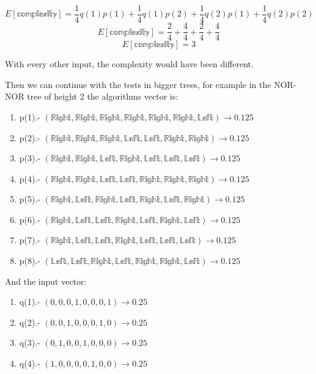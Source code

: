 \documentclass[a4paper,10pt]{article}
\begin{document}
$$E[\mathbb{complexity}] = \frac{1}{4}q(1)p(1) + \frac{1}{4}q(1)p(2) + \frac{1}{4}q(2)p(1) + \frac{1}{4}q(2)p(2)$$
$$E[\mathbb{complexity}] = \frac{2}{4} + \frac{4}{4} + \frac{2}{4} + \frac{4}{4}$$
$$E[\mathbb{complexity}] = 3$$

With every other input, the complexity would have been different.

Then we can continue with the tests in bigger trees, for example in the NOR-NOR tree
of height 2 the algorithms vector is:

\begin{enumerate}
  \item p(1).- $(\mathbb{Right},\mathbb{Right},\mathbb{Right},\mathbb{Right},\mathbb{Right},\mathbb{Right},\mathbb{Left}) \to 0.125$
  \item p(2).- $(\mathbb{Right},\mathbb{Right},\mathbb{Right},\mathbb{Left},\mathbb{Left},\mathbb{Right},\mathbb{Right}) \to 0.125$
  \item p(3).- $(\mathbb{Right},\mathbb{Right},\mathbb{Left},\mathbb{Right},\mathbb{Left},\mathbb{Left},\mathbb{Left}) \to 0.125$
  \item p(4).- $(\mathbb{Right},\mathbb{Right},\mathbb{Left},\mathbb{Left},\mathbb{Right},\mathbb{Right},\mathbb{Right}) \to 0.125$
  \item p(5).- $(\mathbb{Right},\mathbb{Left},\mathbb{Right},\mathbb{Left},\mathbb{Right},\mathbb{Left},\mathbb{Right}) \to 0.125$
  \item p(6).- $(\mathbb{Right},\mathbb{Left},\mathbb{Left},\mathbb{Right},\mathbb{Left},\mathbb{Right},\mathbb{Left}) \to 0.125$
  \item p(7).- $(\mathbb{Right},\mathbb{Left},\mathbb{Left},\mathbb{Right},\mathbb{Left},\mathbb{Left},\mathbb{Left}) \to 0.125$
  \item p(8).- $(\mathbb{Left},\mathbb{Left},\mathbb{Right},\mathbb{Left},\mathbb{Right},\mathbb{Right},\mathbb{Left}) \to 0.125$
\end{enumerate}

And the input vector:

\begin{enumerate}
  \item q(1).- $(0,0,0,1,0,0,0,1) \to 0.25$
  \item q(2).- $(0,0,1,0,0,0,1,0) \to 0.25$
  \item q(3).- $(0,1,0,0,1,0,0,0) \to 0.25$
  \item q(4).- $(1,0,0,0,0,1,0,0) \to 0.25$
\end{enumerate}
\end{document}

